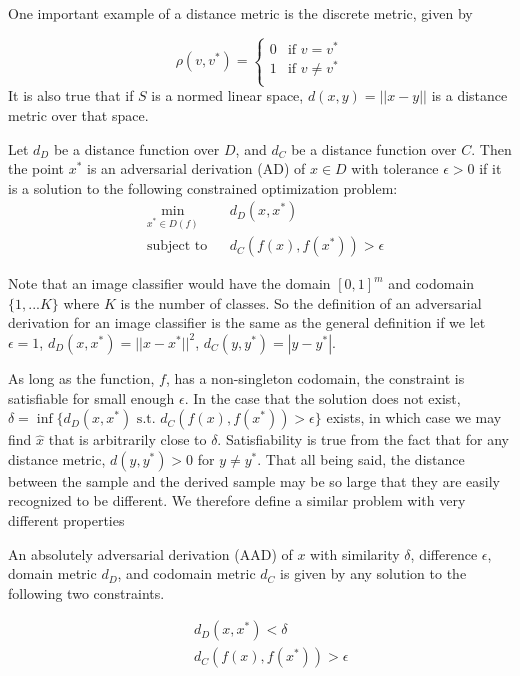 \noindent One important example of a distance metric is the discrete metric, given by

\[
\rho(v,v^*) =
\begin{cases}
0 & \text{if $v = v^*$} \\
1 & \text{if $v \neq v^*$} \\
\end{cases}
\]
\noindent
It is also true that if $S$ is a normed linear space, $d(x,y) = ||x-y||$ is a distance metric over that space.

\begin{definition}
Let $d_D$ be a distance function over $D$, and $d_C$ be a distance function over $C$.  Then the point $x^*$ is an adversarial derivation (AD) of $x\in D$ with tolerance $\epsilon > 0$ if it is a solution to the following constrained optimization problem:
\begin{equation*}
\begin{aligned}
& \underset{x^*\in D(f)}{\text{min}}
& & d_D(x,x^*) \\
& \text{subject to}
& & d_C(f(x),f(x^*)) > \epsilon
\end{aligned}
\end{equation*}
\end{definition}

\noindent
Note that an image classifier would have the domain $[0,1]^m$ and codomain $ \{1,...K\} $ where $K$ is the number of classes.  So the definition of an adversarial derivation for an image classifier is the same as the general definition if we let $\epsilon = 1$, $d_D(x,x^*) = ||x-x^*||^2$, $d_C(y,y^*) = |y-y^*|$.

As long as the function, $f$, has a non-singleton codomain, the constraint is satisfiable for small enough $\epsilon$.  In the case that the solution does not exist, $\delta = \inf \{d_D(x,x^*) \text{ s.t. } d_C(f(x),f(x^*)) > \epsilon\}$ exists, in which case we may find $\hat{x}$ that is arbitrarily close to $\delta$.  Satisfiability is true from the fact that for any distance metric, $d(y,y^*) > 0$ for $y \neq y^*$.  That all being said, the distance between the sample and the derived sample may be so large that they are easily recognized to be different.  We therefore define a similar problem with very different properties

\begin{definition}
An absolutely adversarial derivation (AAD) of $x$ with similarity $\delta$, difference $\epsilon$, domain metric $d_D$, and codomain metric $d_C$ is given by any solution to the following two constraints.

\begin{equation*}
\begin{aligned}
& & d_D(x,x^*) < \delta\\
& & d_C(f(x),f(x^*)) > \epsilon
\end{aligned}
\end{equation*}
\end{definition}


